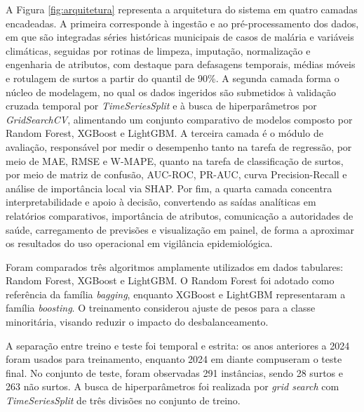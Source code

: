 A Figura \ref{fig:arquitetura} representa a arquitetura do sistema em quatro camadas encadeadas. A primeira corresponde \`a ingest\~ao e ao pr\'e-processamento dos dados, em que s\~ao integradas s\'eries hist\'oricas municipais de casos de mal\'aria e vari\'aveis clim\'aticas, seguidas por rotinas de limpeza, imputa\c{c}\~ao, normaliza\c{c}\~ao e engenharia de atributos, com destaque para defasagens temporais, m\'edias m\'oveis e rotulagem de surtos a partir do quantil de 90\%. A segunda camada forma o n\'ucleo de modelagem, no qual os dados ingeridos s\~ao submetidos \`a valida\c{c}\~ao cruzada temporal por \textit{TimeSeriesSplit} e \`a busca de hiperpar\^ametros por \textit{GridSearchCV}, alimentando um conjunto comparativo de modelos composto por Random Forest, XGBoost e LightGBM. A terceira camada \'e o m\'odulo de avalia\c{c}\~ao, respons\'avel por medir o desempenho tanto na tarefa de regress\~ao, por meio de MAE, RMSE e W-MAPE, quanto na tarefa de classifica\c{c}\~ao de surtos, por meio de matriz de confus\~ao, AUC-ROC, PR-AUC, curva Precision-Recall e an\'alise de import\^ancia local via SHAP. Por fim, a quarta camada concentra interpretabilidade e apoio \`a decis\~ao, convertendo as sa\'idas anal\'iticas em relat\'orios comparativos, import\^ancia de atributos, comunica\c{c}\~ao a autoridades de sa\'ude, carregamento de previs\~oes e visualiza\c{c}\~ao em painel, de forma a aproximar os resultados do uso operacional em vigil\^ancia epidemiol\'ogica.


Foram comparados tr\^es algoritmos amplamente utilizados em dados tabulares: Random Forest, XGBoost e LightGBM. O Random Forest foi adotado como refer\^encia da fam\'ilia \textit{bagging}, enquanto XGBoost e LightGBM representaram a fam\'ilia \textit{boosting}. O treinamento considerou ajuste de pesos para a classe minorit\'aria, visando reduzir o impacto do desbalanceamento.

A separa\c{c}\~ao entre treino e teste foi temporal e estrita: os anos anteriores a 2024 foram usados para treinamento, enquanto 2024 em diante compuseram o teste final. No conjunto de teste, foram observadas 291 inst\^ancias, sendo 28 surtos e 263 n\~ao surtos. A busca de hiperpar\^ametros foi realizada por \textit{grid search} com \textit{TimeSeriesSplit} de tr\^es divis\~oes no conjunto de treino.

